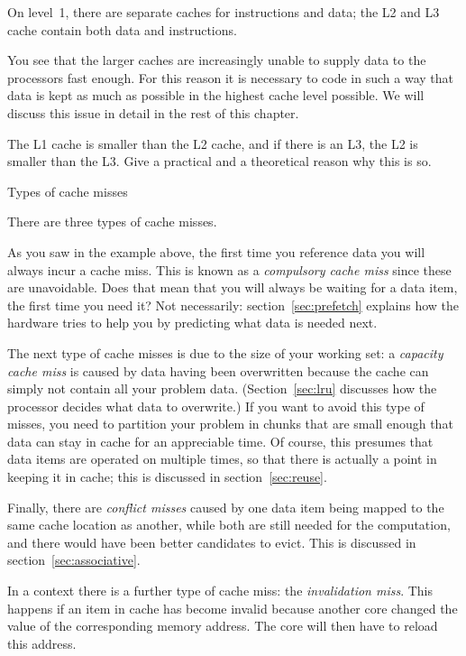 On level~1, there are separate caches for instructions and data; the
L2 and L3 cache contain both data and instructions.

You see that the larger caches are increasingly unable to supply data
to the processors fast enough. For this reason it is necessary to code
in such a way that data is kept as much as possible in the highest
cache level possible. We will discuss this issue in detail in the rest
of this chapter.

\begin{exercise}
  The L1 cache is smaller than the L2 cache, and if there is an L3,
  the L2 is smaller than the L3. Give a practical and a theoretical
  reason why this is so.  
\end{exercise}

 {Types of cache misses}
\label{sec:cache-miss}

There are three types of cache misses.

As you saw in the example above, the first time you reference data you
will always incur a cache miss. This is known as a \emph{compulsory
cache miss} since these are unavoidable.
Does that mean that you will always be waiting for a data item, the first
time you need it? Not necessarily: section~\ref{sec:prefetch} explains
how the hardware tries to help you by predicting what data is needed next.

The next type of cache misses is due to the size of your working set:
a \emph{capacity cache miss} is caused by
data having been overwritten because the cache can simply not contain
all your problem data. (Section~\ref{sec:lru} discusses how the processor
decides what data to overwrite.) If you want to avoid this type of misses, you
need to partition your problem in chunks that are small enough that
data can stay in cache for an appreciable time. Of course, this
presumes that data items are operated on multiple times, so that there
is actually a point in keeping it in cache; this is discussed in
section~\ref{sec:reuse}.

Finally, there are \emph{conflict misses}
caused by one data item being mapped to the same cache location
as another, while both are still needed for the computation, and
there would have been better candidates to evict. This is discussed
in section~\ref{sec:associative}.

In a  context there is a further type of cache miss:
the \emph{invalidation miss}. This happens
if an item in cache has become invalid because another core
changed the value of the corresponding memory address. The core will then
have to reload this address.

